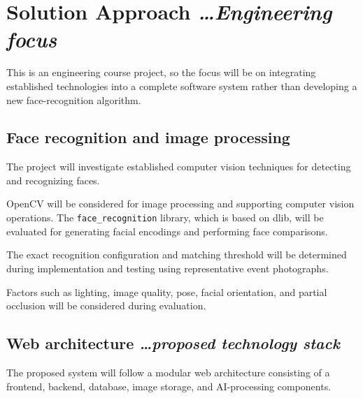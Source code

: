 \documentclass[11pt,a4paper]{article}
\newcommand{\BvrHint}[1]{%
  {\normalfont\normalsize\itshape\hfill #1}}
\begin{document}
\section{Solution Approach%
  \BvrHint{\ldots Engineering focus}}

This is an engineering course project, so the focus will be on
integrating established technologies into a complete software system
rather than developing a new face-recognition algorithm.

\subsection{Face recognition and image processing}

The project will investigate established computer vision techniques
for detecting and recognizing faces.

OpenCV will be considered for image processing and supporting computer
vision operations. The \texttt{face\_recognition} library, which is
based on dlib, will be evaluated for generating facial encodings and
performing face comparisons.

The exact recognition configuration and matching threshold will be
determined during implementation and testing using representative
event photographs.

Factors such as lighting, image quality, pose, facial orientation,
and partial occlusion will be considered during evaluation.

\subsection{Web architecture%
  \BvrHint{\ldots proposed technology stack}}

The proposed system will follow a modular web architecture consisting
of a frontend, backend, database, image storage, and AI-processing
components.
\end{document}

